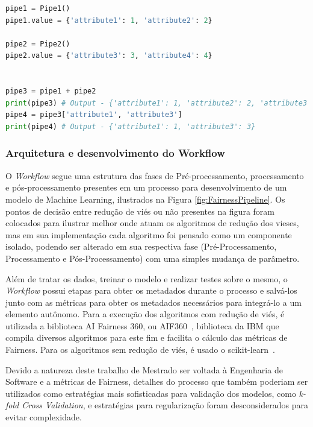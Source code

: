 \documentclass[portugues]{ic-tese}
\begin{document}
\begin{lstlisting}[language=Python, caption=Manipulações para Pipes com métodos especiais,label=cod:PipeAndFilterManipulationSpecial]
pipe1 = Pipe1()
pipe1.value = {'attribute1': 1, 'attribute2': 2}

pipe2 = Pipe2()
pipe2.value = {'attribute3': 3, 'attribute4': 4}


pipe3 = pipe1 + pipe2
print(pipe3) # Output - {'attribute1': 1, 'attribute2': 2, 'attribute3': 3, 'attribute4': 4}
pipe4 = pipe3['attribute1', 'attribute3']
print(pipe4) # Output - {'attribute1': 1, 'attribute3': 3}
\end{lstlisting}

\subsubsection{Arquitetura e desenvolvimento do Workflow}

O \textit{Workflow} segue uma estrutura das fases de Pré-processamento, processamento e pós-processamento presentes em um processo para desenvolvimento de um modelo de Machine Learning, ilustrados na Figura \ref{fig:FairnessPipeline}. Os pontos de decisão entre redução de viés ou não presentes na figura foram colocados para ilustrar melhor onde atuam os algoritmos de redução dos vieses, mas em sua implementação cada algoritmo foi pensado como um componente isolado, podendo ser alterado em sua respectiva fase (Pré-Processamento, Processamento e Pós-Processamento) com uma simples mudança de parâmetro.

Além de tratar os dados, treinar o modelo e realizar testes sobre o mesmo, o \textit{Workflow} possui etapas para obter os metadados durante o processo e salvá-los junto com as métricas para obter os metadados necessários para integrá-lo a um elemento autônomo. Para a execução dos algoritmos com redução de viés, é utilizada a biblioteca AI Fairness 360, ou AIF360~\citep{AIF360_2022}, biblioteca da IBM que compila diversos algoritmos para este fim e facilita o cálculo das métricas de Fairness. Para os algoritmos sem redução de viés, é usado o scikit-learn~\citep{scikit_2022}.

Devido a natureza deste trabalho de Mestrado ser voltada à Engenharia de Software e a métricas de Fairness, detalhes do processo que também poderiam ser utilizados como estratégias mais sofisticadas para validação dos modelos, como \textit{k-fold Cross Validation}, e estratégias para regularização foram desconsiderados para evitar complexidade.
\end{document}
